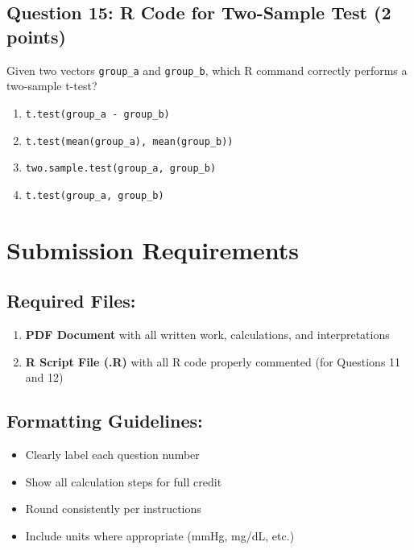 \documentclass[11pt]{article}
\begin{document}
\vspace{0.5cm}

\subsection*{Question 15: R Code for Two-Sample Test (2 points)}

Given two vectors \texttt{group\_a} and \texttt{group\_b}, which R command correctly performs a two-sample t-test?

\begin{enumerate}[label=\Alph*)]
\item \texttt{t.test(group\_a - group\_b)}
\item \texttt{t.test(mean(group\_a), mean(group\_b))}
\item \texttt{two.sample.test(group\_a, group\_b)}
\item \texttt{t.test(group\_a, group\_b)}
\end{enumerate}

\vspace{0.5cm}

\newpage

\section*{Submission Requirements}

\subsection*{Required Files:}
\begin{enumerate}
\item \textbf{PDF Document} with all written work, calculations, and interpretations
\item \textbf{R Script File (.R)} with all R code properly commented (for Questions 11 and 12)
\end{enumerate}

\subsection*{Formatting Guidelines:}
\begin{itemize}
\item Clearly label each question number
\item Show all calculation steps for full credit
\item Round consistently per instructions
\item Include units where appropriate (mmHg, mg/dL, etc.)
\end{itemize}
\end{document}
